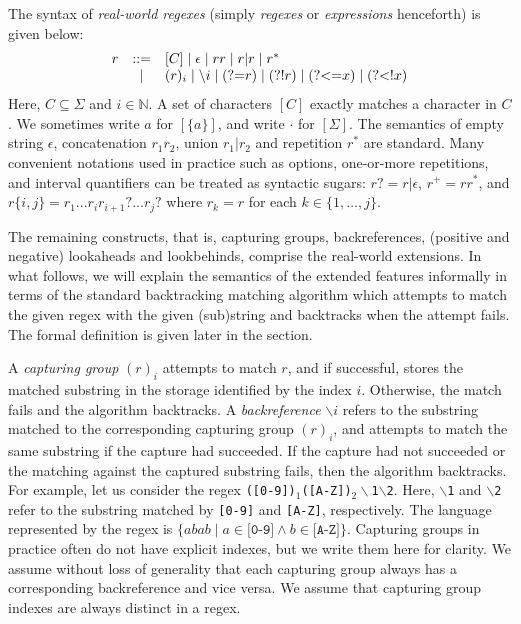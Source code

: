 \documentclass[conference]{IEEEtran}
\newcommand{\any}{\cdot}
\begin{document}
The syntax of {\em real-world regexes} (simply {\em regexes} or {\em expressions} henceforth) is given below:
\[
\begin{array}{rcl}
r & ::= & [C] \mid \epsilon \mid rr \mid r|r \mid r^* \\
& \mid & (r)_i \mid \backslash i \mid \mbox{(?=$r$)} \mid \mbox{(?!$r$)} \mid \mbox{(?\textless=$x$)} \mid \mbox{(?\textless!$x$)} \\
\end{array}
\]
Here, $C \subseteq \Sigma$ and $i \in \mathbb{N}$.
A set of characters $[C]$ exactly matches a character in $C$.
We sometimes write $a$ for $[\{a\}]$, and write $\any$ for $[\Sigma]$.  The semantics
of empty string $\epsilon$, concatenation $r_1 r_2$, union $r_1 | r_2$ and repetition $r^*$ are standard.  
Many convenient notations used in practice such as options, one-or-more repetitions, and interval quantifiers can be treated as syntactic sugars: $r? = r | \epsilon$, $r^+ = rr^*$, and $r\{i,j\} = r_1 ... r_i r_{i+1}? ... r_{j}?$ where $r_k = r$ for each $k \in \{1,\dots,j\}$.


The remaining constructs, that is, capturing groups, backreferences, (positive and negative) lookaheads and lookbehinds, comprise the real-world extensions.  In what follows, we will explain the semantics of the extended features informally in terms of the standard backtracking matching algorithm which attempts to match the given regex with the given (sub)string and backtracks when the attempt fails.  The formal definition is given later in the section.

A {\em capturing group} $(r)_i$ attempts to match $r$, and if successful, stores the matched substring in the storage identified by the index $i$.  Otherwise, the match fails and the algorithm backtracks.
A {\em backreference} $\backslash i$ refers to the substring matched to the corresponding capturing group $(r)_i$, and attempts to match the same substring if the capture had succeeded.  If the capture had not succeeded or the matching against the captured substring fails, then the algorithm backtracks.
For example, let us consider the regex \texttt{([0-9])$_1$([A-Z])$_2\backslash$1$\backslash$2}.
Here, \texttt{$\backslash$1} and \texttt{$\backslash$2} refer to the substring matched by \texttt{[0-9]} and \texttt{[A-Z]}, respectively.  The language represented by the regex is $\{ abab \mid a \in \texttt{[0-9]} \wedge b \in \texttt{[A-Z]} \}$.
Capturing groups in practice often do not have explicit indexes, but we write them here for clarity.
We assume without loss of generality that each capturing group always has a corresponding backreference and vice versa.
We assume that capturing group indexes are always distinct in a regex.
\end{document}

